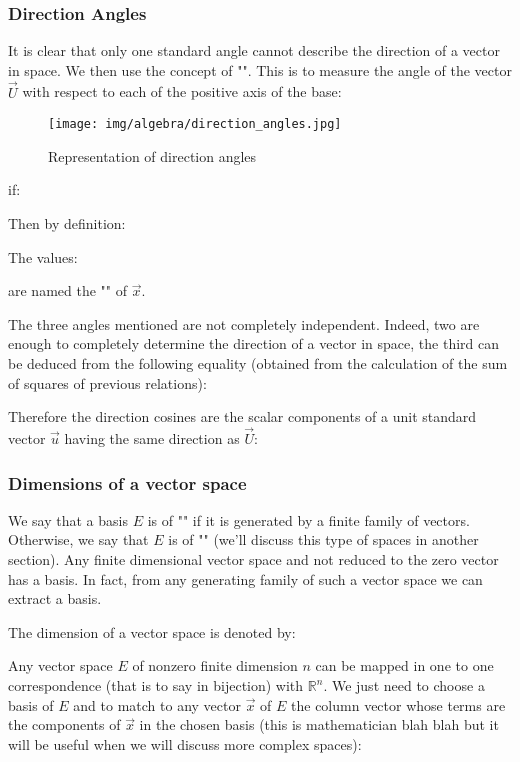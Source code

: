 	\pagebreak
	\subsubsection{Direction Angles}
	It is clear that only one standard angle cannot describe the direction of a vector in space. We then use the concept of "". This is to measure the angle of the vector $\vec{U}$ with respect to each of the positive axis of the base:
	\begin{figure}[H]
		\centering
		\texttt{[image: img/algebra/direction\_angles.jpg]}
		\caption{Representation of direction angles}
	\end{figure}
	if:
	
	Then by definition:
	
	The values:
	
	are named the "" of $\vec{x}$.
	
	The three angles mentioned are not completely independent. Indeed, two are enough to completely determine the direction of a vector in space, the third can be deduced from the following equality (obtained from the calculation of the sum of squares of previous relations):
	
	Therefore the direction cosines are the scalar components of a unit standard vector  $\vec{u}$ having the same direction as $\vec{U}$:
	
	
	\subsubsection{Dimensions of a vector space}
	We say that a basis $E$ is of "" if it is generated by a finite family of vectors. Otherwise, we say that $E$ is of "" (we'll discuss this type of spaces in another section). Any finite dimensional vector space and not reduced to the zero vector has a basis. In fact, from any generating family of such a vector space we can extract a basis.
	
	The dimension of a vector space is denoted by:
	
	Any vector space $E$ of nonzero finite dimension $n$ can be mapped in one to one correspondence (that is to say in bijection) with $\mathbb{R}^n$. We just need to choose a basis of $E$ and to match to any vector $\vec{x}$ of $E$ the column vector whose terms are the components of $\vec{x}$ in the chosen basis (this is  mathematician blah blah but it will be useful when we will discuss more complex spaces):
	
